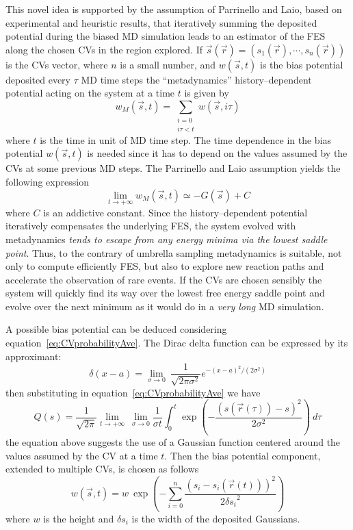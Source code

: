 This novel idea is supported by the assumption of Parrinello and Laio, based on experimental and heuristic 
results, that iteratively summing the deposited potential during the biased \ac{MD} simulation leads to
an estimator of the \ac{FES} along the chosen \acp{CV} in the region explored. If
$\vec s(\vec r) = (s_1(\vec r), \cdots, s_n(\vec r))$ is the \acp{CV} vector, where $n$ is a small number, and
$w(\vec s, t)$ is the bias potential deposited every $\tau$ \ac{MD} time steps the ``metadynamics''
history--dependent potential acting on the system at a time $t$ is given by
\begin{equation*}
	w_M(\vec s, t) = \sum_{\substack{i=0 \\ i\tau < t}} w(\vec s, i\tau)
\end{equation*}
where $t$ is the time in unit of \ac{MD} time step. The time dependence in the bias potential $w(\vec s, t)$ is
needed since it has to depend on the values assumed by the \acp{CV} at some previous \ac{MD} steps. The 
Parrinello and Laio assumption yields the following expression
\begin{equation}
	\lim_{t\to + \infty} w_M(\vec s, t)  \simeq -G(\vec s) + C
	\label{eq:metadfes}
\end{equation}
where $C$ is an addictive constant. Since the history--dependent potential iteratively compensates the underlying
\ac{FES}, the system evolved with metadynamics \textit{tends to escape from any energy minima via the lowest
saddle point}. Thus, to the contrary of umbrella sampling metadynamics is suitable, not only to compute
efficiently \ac{FES}, but also to explore new reaction paths and accelerate the observation of rare events. If the
\acp{CV} are chosen sensibly the system will quickly find its way over the lowest free energy saddle point and
evolve over the next minimum as it would do in a \textit{very long} \ac{MD} simulation.

A possible bias potential can be deduced considering equation~\eqref{eq:CVprobabilityAve}. The Dirac delta
function can be expressed by its approximant:
\begin{equation*}
	\delta(x-a) = \lim_{\sigma\to 0}\ \frac{1}{\sqrt{2 \pi \sigma^2}}e^{-(x-a)^2/(2\sigma^2)}
\end{equation*}
then substituting in equation~\eqref{eq:CVprobabilityAve} we have
\begin{equation*}
	Q(s) = \frac{1}{\sqrt{2\pi}}\lim_{t\to +\infty}\ \lim_{\sigma\to 0} \frac{1}{\sigma t}\int_0^t \exp{ \left ( -\frac{(s(\vec r(\tau))-s)^2}{2\sigma^2} \right )} \ d\tau
\end{equation*}
the equation above suggests the use of a Gaussian function centered around the values assumed by the \ac{CV} at a
time $t$. Then the bias potential component, extended to multiple \acp{CV}, is chosen as follows
\begin{equation*}
	w(\vec s, t) = w\ \exp\left ({-\sum_{i=0}^n \frac{(s_i - s_i(\vec r(t)))^2}{2{\delta s_i}^2} }\right )
\end{equation*}
where $w$ is the height and $\delta s_i$ is the width of the deposited Gaussians.

